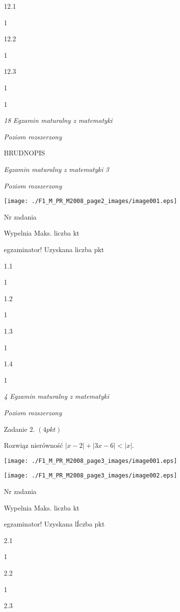 \documentclass[a4paper,12pt]{article}
\begin{document}
12.1

1

12.2

1

12.3

1

1





{\it 18 Egzamin maturalny z matematyki}

{\it Poziom rozszerzony}

BRUDNOPIS





{\it Egzamin maturalny z matematyki 3}

{\it Poziom rozszerzony}
\begin{center}
\texttt{[image: ./F1\_M\_PR\_M2008\_page2\_images/image001.eps]}
\end{center}
Nr zadania

Wypelnia Maks. liczba kt

egzaminator! Uzyskana liczba pkt

1.1

1

1.2

1

1.3

1

1.4

1





{\it 4 Egzamin maturalny z matematyki}

{\it Poziom rozszerzony}

Zadanie 2. $(4pkt)$

Rozwiąz nierówność $|x-2|+|3x-6|<|x|.$
\begin{center}
\texttt{[image: ./F1\_M\_PR\_M2008\_page3\_images/image001.eps]}

\texttt{[image: ./F1\_M\_PR\_M2008\_page3\_images/image002.eps]}
\end{center}
Nr zadania

Wypelnia Maks. liczba kt

egzaminator! Uzyskana lÍczba pkt

2.1

1

2.2

1

2.3
\end{document}
